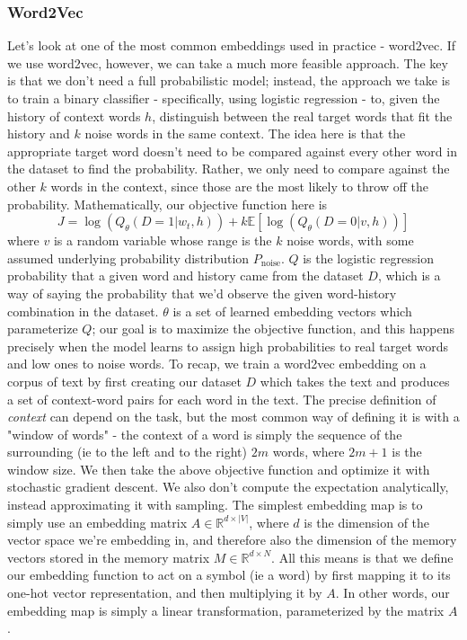 \documentclass{article}
\begin{document}
\subsubsection{Word2Vec}
 Let's look at one of the most common embeddings used in practice - word2vec. If we use word2vec, however, we can take a much more feasible approach. The key is that we don't need a full probabilistic model; instead, the approach we take is to train a binary classifier - specifically, using logistic regression - to, given the history of context words $ h $, distinguish between the real target words that fit the history and $ k $ noise words in the same context. The idea here is that the appropriate target word doesn't need to be compared against every other word in the dataset to find the probability. Rather, we only need to compare against the other $ k $ words in the context, since those are the most likely to throw off the probability. Mathematically, our objective function here is
 $$ J = \log(Q_\theta (D = 1 | w_t, h)) + k \mathbb{E}[ \log(Q_\theta (D = 0 | v, h)) ] $$
 where $ v $ is a random variable whose range is the $ k $ noise words, with some assumed underlying probability distribution $ P_{\text{noise}} $. $ Q $ is the logistic regression probability that a given word and history came from the dataset $ D $, which is a way of saying the probability that we'd observe the given word-history combination in the dataset. $ \theta $ is a set of learned embedding vectors which parameterize $ Q $; our goal is to maximize the objective function, and this happens precisely when the model learns to assign high probabilities to real target words and low ones to noise words.
\newline \newline
To recap, we train a word2vec embedding on a corpus of text by first creating our dataset $ D $ which takes the text and produces a set of context-word pairs for each word in the text. The precise definition of \textit{context} can depend on the task, but the most common way of defining it is with a "window of words" - the context of a word is simply the sequence of the surrounding (ie to the left and to the right) $ 2 m $ words, where $ 2 m + 1 $ is the window size. We then take the above objective function and optimize it with stochastic gradient descent. We also don't compute the expectation analytically, instead approximating it with sampling.
\newline \newline
The simplest embedding map is to simply use an embedding matrix $ A \in \mathbb{R}^{d \times | V |} $, where $ d $ is the dimension of the vector space we're embedding in, and therefore also the dimension of the memory vectors stored in the memory matrix $ M \in \mathbb{R}^{d \times N} $. All this means is that we define our embedding function to act on a symbol (ie a word) by first mapping it to its one-hot vector representation, and then multiplying it by $ A $. In other words, our embedding map is simply a linear transformation, parameterized by the matrix $ A $.
\end{document}
